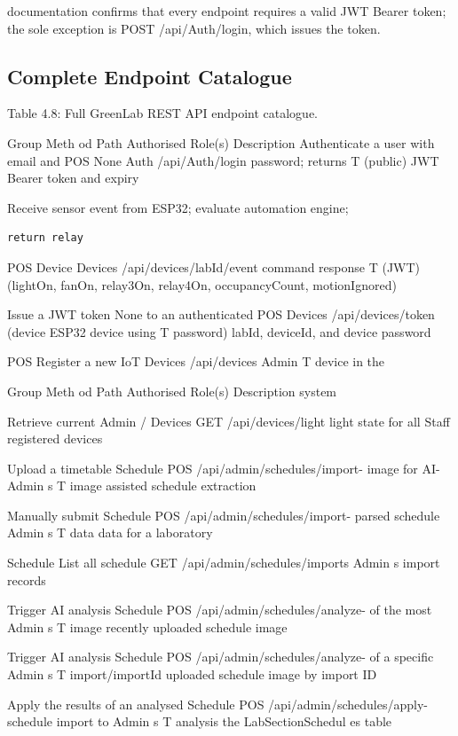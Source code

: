 documentation confirms that every endpoint requires a valid JWT Bearer token; the sole
exception is POST /api/Auth/login, which issues the token.

\subsection{Complete Endpoint Catalogue}


Table 4.8: Full GreenLab REST API endpoint catalogue.


Group Meth
od Path Authorised
Role(s) Description
Authenticate a user
with email and
POS None
Auth /api/Auth/login password; returns
T (public)
JWT Bearer token
and expiry

Receive sensor
event from ESP32;
evaluate
automation engine;
\begin{lstlisting}
return relay
\end{lstlisting}

POS Device
Devices /api/devices/{labId}/event command response
T (JWT)
(lightOn, fanOn,
relay3On,
relay4On,
occupancyCount,
motionIgnored)

Issue a JWT token
None to an authenticated
POS
Devices /api/devices/token (device ESP32 device using
T
password) labId, deviceId, and
device password

POS Register a new IoT
Devices /api/devices Admin
T device in the



Group Meth
od Path Authorised
Role(s) Description
system

Retrieve current
Admin /
Devices GET /api/devices/light light state for all
Staff
registered devices

Upload a timetable
Schedule POS /api/admin/schedules/import- image for AI-
Admin
s T image assisted schedule
extraction

Manually submit
Schedule POS /api/admin/schedules/import- parsed schedule
Admin
s T data data for a
laboratory


Schedule List all schedule
GET /api/admin/schedules/imports Admin
s import records

Trigger AI analysis
Schedule POS /api/admin/schedules/analyze- of the most
Admin
s T image recently uploaded
schedule image

Trigger AI analysis
Schedule POS /api/admin/schedules/analyze- of a specific
Admin
s T import/{importId} uploaded schedule
image by import ID

Apply the results of
an analysed
Schedule POS /api/admin/schedules/apply- schedule import to
Admin
s T analysis the
LabSectionSchedul
es table

